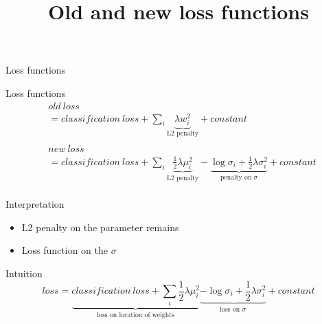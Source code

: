 \documentclass{beamer}
\newcommand{\undermath}[2]{\underbrace{#1}_\text{#2}}
\begin{document}
\begin{frame}{Loss functions}
	\title{Old and new loss functions}
	\begin{block}{Loss functions}
		\begin{align*}
			  & old \ loss                                                                                                                                                                             \\
			  & = classification \ loss +   \sum_i  \undermath{\lambda  w_i^2}{L2 penalty}                                                                  +constant                                  \\
			  &                                                                                                                                                                                        \\
			  & new \ loss                                                                                                                                                                             \\		
			  & = classification \ loss +    \sum_i         \undermath{\frac{1}{2}\lambda\mu_i^2 }{L2 penalty}- \undermath{\log\sigma_i + \frac{1}{2}\lambda \sigma_i^2}{penalty on $\sigma$}+constant \\
		\end{align*}
	\end{block}
	
	\begin{block}{Interpretation}
		\begin{itemize}
			\item L2 penalty on the parameter remains
			\item Loss function on the $\sigma$ 
		\end{itemize}
		
	\end{block}
\end{frame}


\begin{frame}{Intuition}
	\begin{equation*}
		loss = \undermath{classification \ loss + \sum_i \frac{1}{2}\lambda\mu_i^2 }{loss on location of weights} \undermath{-\log\sigma_i + \frac{1}{2}\lambda \sigma_i^2}{loss on $\sigma$}+constant
	\end{equation*}
\end{frame}
\end{document}
